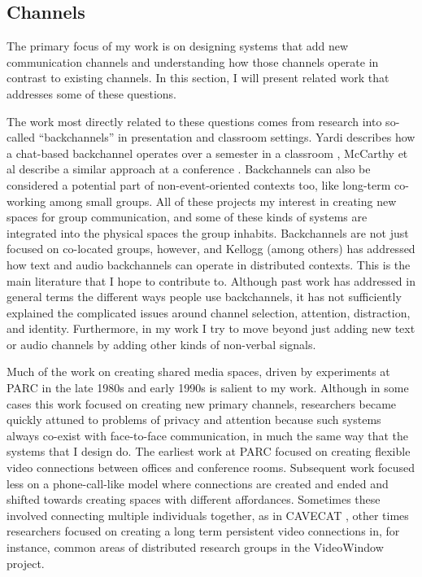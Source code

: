 \documentclass{tufte-handout}
\begin{document}
\subsection{Channels}

The primary focus of my work is on designing systems that add new communication channels and understanding how those channels operate in contrast to existing channels. In this section, I will present related work that addresses some of these questions.

The work most directly related to these questions comes from research into so-called ``backchannels'' in presentation and classroom settings. Yardi describes how a chat-based backchannel operates over a semester in a classroom \citet{Yardi:2006uk}, McCarthy et al describe a similar approach at a conference \citet{mccarthy_digital_2004}. Backchannels can also be considered a potential part of non-event-oriented contexts too, like long-term co-working among small groups. \citet{Huang:2003ef} All of these projects my interest in creating new spaces for group communication, and some of these kinds of systems are integrated into the physical spaces the group inhabits. Backchannels are not just focused on co-located groups, however, and Kellogg (among others) \citet{kellogg_leveraging_2006} \citet{Yankelovich:2005bx} has addressed how text and audio backchannels can operate in distributed contexts. This is the main literature that I hope to contribute to. Although past work has addressed in general terms the different ways people use backchannels, it has not sufficiently explained the complicated issues around channel selection, attention, distraction, and identity. Furthermore, in my work I try to move beyond just adding new text or audio channels by adding other kinds of non-verbal signals.

Much of the work on creating shared media spaces, driven by experiments at PARC in the late 1980s and early 1990s is salient to my work. Although in some cases this work focused on creating new primary channels, researchers became quickly attuned to problems of privacy and attention because such systems always co-exist with face-to-face communication, in much the same way that the systems that I design do. The earliest work at PARC \citet{olsen_bly_portland} focused on creating flexible video connections between offices and conference rooms. Subsequent work focused less on a phone-call-like model where connections are created and ended and shifted towards creating spaces with different affordances. Sometimes these involved connecting multiple individuals together, as in CAVECAT \citet{cavecat}, other times researchers focused on creating a long term persistent video connections in, for instance, common areas of distributed research groups in the VideoWindow project\citet{videowindow}. 
\end{document}
